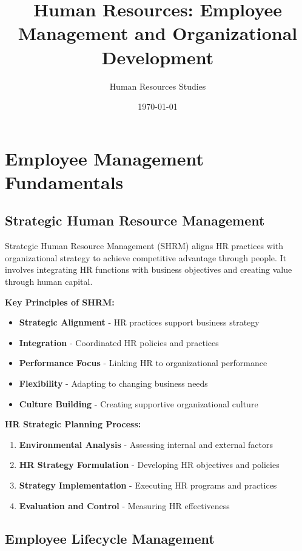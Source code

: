 \documentclass[12pt]{article}
\title{Human Resources: Employee Management and Organizational Development}
\author{Human Resources Studies}
\date{\today}
\begin{document}
\maketitle

\section{Employee Management Fundamentals}

\subsection{Strategic Human Resource Management}
Strategic Human Resource Management (SHRM) aligns HR practices with organizational strategy to achieve competitive advantage through people. It involves integrating HR functions with business objectives and creating value through human capital.

\textbf{Key Principles of SHRM:}
\begin{itemize}
    \item \textbf{Strategic Alignment} - HR practices support business strategy
    \item \textbf{Integration} - Coordinated HR policies and practices
    \item \textbf{Performance Focus} - Linking HR to organizational performance
    \item \textbf{Flexibility} - Adapting to changing business needs
    \item \textbf{Culture Building} - Creating supportive organizational culture
\end{itemize}

\textbf{HR Strategic Planning Process:}
\begin{enumerate}
    \item \textbf{Environmental Analysis} - Assessing internal and external factors
    \item \textbf{HR Strategy Formulation} - Developing HR objectives and policies
    \item \textbf{Strategy Implementation} - Executing HR programs and practices
    \item \textbf{Evaluation and Control} - Measuring HR effectiveness
\end{enumerate}

\subsection{Employee Lifecycle Management}
\end{document}
